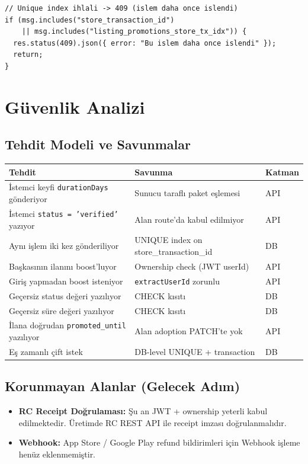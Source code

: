 \documentclass[12pt,a4paper]{article}
\begin{document}
\begin{lstlisting}[language={}]
// Unique index ihlali -> 409 (islem daha once islendi)
if (msg.includes("store_transaction_id")
    || msg.includes("listing_promotions_store_tx_idx")) {
  res.status(409).json({ error: "Bu islem daha once islendi" });
  return;
}
\end{lstlisting}

\section{Güvenlik Analizi}

\subsection{Tehdit Modeli ve Savunmalar}

\begin{longtable}{p{4.5cm} p{4cm} l}
  \toprule
  \textbf{Tehdit} & \textbf{Savunma} & \textbf{Katman}\\
  \midrule
  \endhead
  İstemci keyfi \texttt{durationDays} gönderiyor & Sunucu taraflı paket eşlemesi & API\\
  İstemci \texttt{status = 'verified'} yazıyor & Alan route'da kabul edilmiyor & API\\
  Aynı işlem iki kez gönderiliyor & UNIQUE index on store\_transaction\_id & DB\\
  Başkasının ilanını boost'luyor & Ownership check (JWT userId) & API\\
  Giriş yapmadan boost isteniyor & \texttt{extractUserId} zorunlu & API\\
  Geçersiz status değeri yazılıyor & CHECK kısıtı & DB\\
  Geçersiz süre değeri yazılıyor & CHECK kısıtı & DB\\
  İlana doğrudan \texttt{promoted\_until} yazılıyor & Alan adoption PATCH'te yok & API\\
  Eş zamanlı çift istek & DB-level UNIQUE + transaction & DB\\
  \bottomrule
\end{longtable}

\subsection{Korunmayan Alanlar (Gelecek Adım)}

\begin{itemize}[leftmargin=1.5em]
  \item \textbf{RC Receipt Doğrulaması:} Şu an JWT + ownership yeterli kabul edilmektedir.
        Üretimde RC REST API ile receipt imzası doğrulanmalıdır.
  \item \textbf{Webhook:} App Store / Google Play refund bildirimleri için
        Webhook işleme henüz eklenmemiştir.
\end{itemize}
\end{document}
